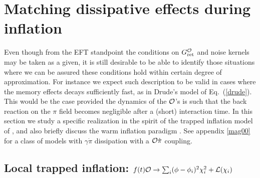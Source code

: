 \documentclass[11pt,amsmath,floats,floatfix,nofootinbib,secnumarabic, superscriptaddress, tightenlines]{revtex4}
\newcommand{\calo}{{\cal O}}
\newcommand{\calL}{{\cal L}}
\begin{document}
{ \section{Matching dissipative effects during inflation}\label{matching}

Even though from the EFT standpoint the conditions on $G^{\calo}_{\rm ret}$ and noise kernels may be taken as a given, it is still desirable to be able to identify those situations where we can be assured these conditions hold within certain degree of approximation. For instance we expect such description to be valid in cases where the memory effects decays sufficiently fast, as in Drude's model of Eq.~(\ref{drude}). This would be the case provided the dynamics of the $\calo$'s is such that the back reaction on the $\pi$ field becomes negligible after a (short) interaction time. In this section we study a specific realization in the spirit of the trapped inflation model of \cite{trapped}, and also briefly discuss the warm inflation paradigm \cite{berera1,berera2,warm}. See appendix \ref{mag00} for a class of models with $\gamma\dot\pi$ dissipation with a $\calo\dot\pi$ coupling.

\subsection{Local trapped inflation: $f(t)\calo \to \sum_i(\phi-\phi_i)^2\chi^2_i + \calL(\chi_i)$}\label{localtrap}

}
\end{document}
